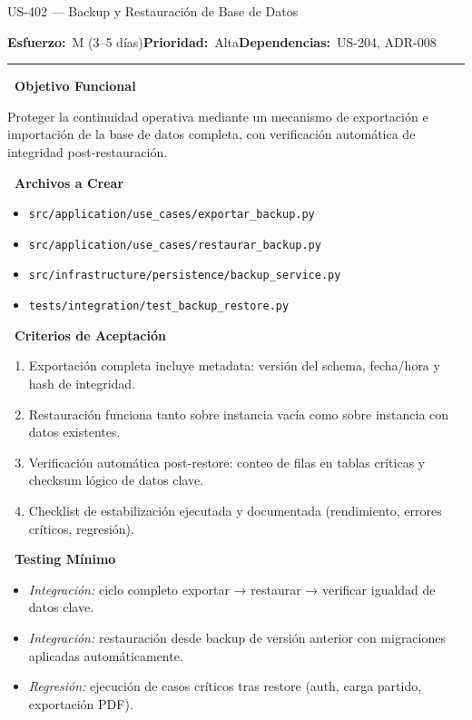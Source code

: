 \documentclass[11pt,a4paper]{article}
\newcommand{\fpath}[1]{\texttt{\small #1}}
\newcommand{\usfield}[2][\;]{%
  \par\vspace{5pt}%
  {\small\textbf{\textcolor{primary}{#2}}}\par\vspace{2pt}%
}
\newcommand{\usmeta}[3]{%
  \vspace{2pt}%
  {\small\textcolor{secondary}{%
    \textbf{Esfuerzo:}~#1\quad\textbf{Prioridad:}~#2\quad\textbf{Dependencias:}~#3%
  }}%
  \par\vspace{4pt}%
  \textcolor{bordergray}{\rule{\linewidth}{0.4pt}}\par\vspace{4pt}%
}
\begin{document}
\begin{uscard}{US-402 — Backup y Restauración de Base de Datos}

\usmeta{M (3–5 días)}{Alta}{US-204, ADR-008}

\usfield{\faAlignLeft\ Objetivo Funcional}
Proteger la continuidad operativa mediante un mecanismo de exportación e importación de la base de datos completa, con verificación automática de integridad post-restauración.

\usfield{\faFolderOpen\ Archivos a Crear}
\begin{itemize}[nosep, leftmargin=1.6em]
  \item \fpath{src/application/use\_cases/exportar\_backup.py}
  \item \fpath{src/application/use\_cases/restaurar\_backup.py}
  \item \fpath{src/infrastructure/persistence/backup\_service.py}
  \item \fpath{tests/integration/test\_backup\_restore.py}
\end{itemize}

\usfield{\faCheckCircle\ Criterios de Aceptación}
\begin{enumerate}[label=\textcolor{accent}{\textbf{AC\arabic*.}}, nosep, leftmargin=2.2em]
  \item Exportación completa incluye metadata: versión del schema, fecha/hora y hash de integridad.
  \item Restauración funciona tanto sobre instancia vacía como sobre instancia con datos existentes.
  \item Verificación automática post-restore: conteo de filas en tablas críticas y checksum lógico de datos clave.
  \item Checklist de estabilización ejecutada y documentada (rendimiento, errores críticos, regresión).
\end{enumerate}

\usfield{\faFlask\ Testing Mínimo}
\begin{itemize}[nosep, leftmargin=1.6em]
  \item \textit{Integración:} ciclo completo exportar → restaurar → verificar igualdad de datos clave.
  \item \textit{Integración:} restauración desde backup de versión anterior con migraciones aplicadas automáticamente.
  \item \textit{Regresión:} ejecución de casos críticos tras restore (auth, carga partido, exportación PDF).
\end{itemize}

\end{uscard}
\end{document}
